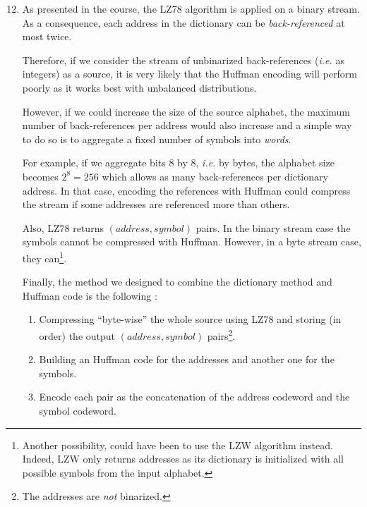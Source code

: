\documentclass[a4paper, 12pt]{article}
\begin{document}
    \begin{enumerate}[leftmargin=*]
        \setcounter{enumi}{11}
        
        \item As presented in the course, the LZ78 algorithm is applied on a binary stream. As a consequence, each address in the dictionary can be \emph{back-referenced} at most twice.
        
        Therefore, if we consider the stream of unbinarized back-references (\emph{i.e.} as integers) as a source, it is very likely that the Huffman encoding will perform poorly as it works best with unbalanced distributions.
        
        However, if we could increase the size of the source alphabet, the maximum number of back-references per address would also increase and a simple way to do so is to aggregate a fixed number of symbols into \emph{words}.
        
        For example, if we aggregate bits 8 by 8, \emph{i.e.} by bytes, the alphabet size becomes $2^8 = 256$ which allows as many back-references per dictionary address. In that case, encoding the references with Huffman could compress the stream if some addresses are referenced more than others.
        
        Also, LZ78 returns $(address, symbol)$ pairs. In the binary stream case the symbols cannot be compressed with Huffman. However, in a byte stream case, they can\footnote{Another possibility, could have been to use the LZW \cite{welch1984technique} algorithm instead. Indeed, LZW only returns addresses as its dictionary is initialized with all possible symbols from the input alphabet.}.
        
        Finally, the method we designed to combine the dictionary method and Huffman code is the following :
        
        \begin{enumerate}[noitemsep, label=\roman*.]
            \item Compressing \enquote{byte-wise} the whole source using LZ78 and storing (in order) the output $(address, symbol)$ pairs\footnote{The addresses are \emph{not} binarized.}.
            \item Building an Huffman code for the addresses and another one for the symbols.
            \item Encode each pair as the concatenation of the address codeword and the symbol codeword.
        \end{enumerate}


\end{enumerate}
\end{document}
